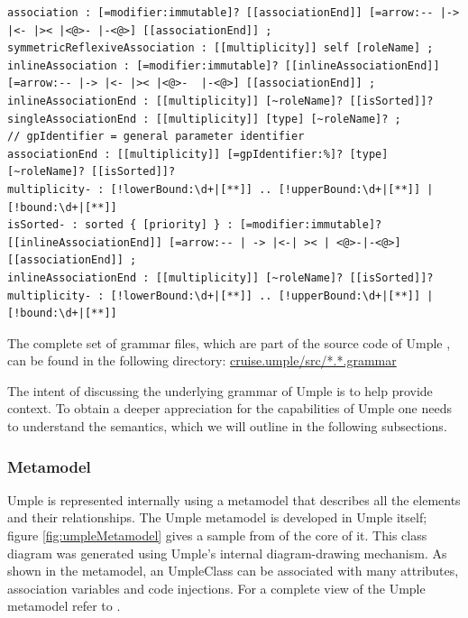 \begin{lstlisting}[language={grammar}, label=lst:fullGrammar3,caption=Umple Grammar for associations]
association : [=modifier:immutable]? [[associationEnd]] [=arrow:-- |-> |<- |>< |<@>- |-<@>] [[associationEnd]] ;
symmetricReflexiveAssociation : [[multiplicity]] self [roleName] ;
inlineAssociation : [=modifier:immutable]? [[inlineAssociationEnd]] [=arrow:-- |-> |<- |>< |<@>-  |-<@>] [[associationEnd]] ;
inlineAssociationEnd : [[multiplicity]] [~roleName]? [[isSorted]]?
singleAssociationEnd : [[multiplicity]] [type] [~roleName]? ;
// gpIdentifier = general parameter identifier
associationEnd : [[multiplicity]] [=gpIdentifier:%]? [type] [~roleName]? [[isSorted]]?
multiplicity- : [!lowerBound:\d+|[**]] .. [!upperBound:\d+|[**]] | [!bound:\d+|[**]]
isSorted- : sorted { [priority] } : [=modifier:immutable]? [[inlineAssociationEnd]] [=arrow:-- | -> |<-| >< | <@>-|-<@>] [[associationEnd]] ;
inlineAssociationEnd : [[multiplicity]] [~roleName]? [[isSorted]]?
multiplicity- : [!lowerBound:\d+|[**]] .. [!upperBound:\d+|[**]] | [!bound:\d+|[**]]
\end{lstlisting}

The complete set of grammar files, which are part of the source code of Umple \cite{umpleRepository}, can be found in the following directory:
\url{cruise.umple/src/*.*.grammar}

The intent of discussing the underlying grammar of Umple is to help provide context. To obtain a deeper appreciation for the capabilities of Umple one needs to understand the semantics, which we will outline in the following subsections.

\subsubsection{Metamodel}
Umple is represented internally using a metamodel that describes all the elements and their relationships. The Umple metamodel is developed in Umple itself; figure \ref{fig:umpleMetamodel} gives a sample from of the core of it. This class diagram was generated using Umple's internal diagram-drawing mechanism. As shown in the metamodel, an UmpleClass can be associated with many attributes, association variables and code injections. For a complete view of the Umple metamodel refer to \cite{UmpleMetamodel}.

